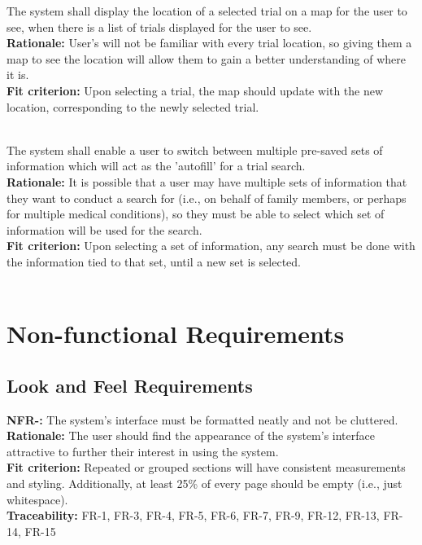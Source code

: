\documentclass[12pt, titlepage]{article}
\newcounter{NFR_Counter}
\newcounter{FR_Counter}
\begin{document}
The system shall display the location of a selected trial on a map for the user to see, when there is a list of trials displayed for the user to see.\\
\textbf{Rationale:}
User's will not be familiar with every trial location, so giving them a map to see the location will allow them to gain a better understanding of where it is.\\
\textbf{Fit criterion:}
Upon selecting a trial, the map should update with the new location, corresponding to the newly selected trial.\\~\\
\addtocounter{FR_Counter}{1}


The system shall enable a user to switch between multiple pre-saved sets of information which will act as the 'autofill' for a trial search.\\
\textbf{Rationale:}
It is possible that a user may have multiple sets of information that they want to conduct a search for (i.e., on behalf of family members, or perhaps 
for multiple medical conditions), so they must be able to select which set of information will be used for the search.\\
\textbf{Fit criterion:}
Upon selecting a set of information, any search must be done with the information tied to that set, until a new set is selected.\\~\\
\addtocounter{FR_Counter}{1}

\section{Non-functional Requirements}

\subsection{Look and Feel Requirements}

\textbf{NFR-\the\value{NFR_Counter}:}
The system's interface must be formatted neatly and not be cluttered. \\
\textbf{Rationale:}
The user should find the appearance of the system's interface attractive to further their interest in using the system. \\
\textbf{Fit criterion:}
Repeated or grouped sections will have consistent measurements and styling. Additionally, at least 25\% of every page should be empty (i.e., just whitespace). \\
\textbf{Traceability:}
FR-1, FR-3, FR-4, FR-5, FR-6, FR-7, FR-9, FR-12, FR-13, FR-14, FR-15 \\~\\
\addtocounter{NFR_Counter}{1}
\end{document}
